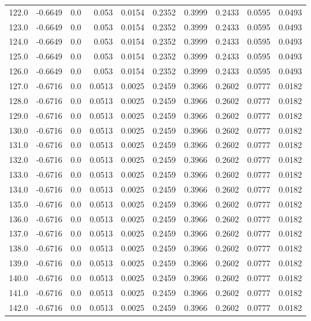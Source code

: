 \begin{longtable}{lrrrrrrrrr}
122.0 & -0.6649 & 0.0 & 0.053 & 0.0154 & 0.2352 & 0.3999 & 0.2433 & 0.0595 & 0.0493 \\
123.0 & -0.6649 & 0.0 & 0.053 & 0.0154 & 0.2352 & 0.3999 & 0.2433 & 0.0595 & 0.0493 \\
124.0 & -0.6649 & 0.0 & 0.053 & 0.0154 & 0.2352 & 0.3999 & 0.2433 & 0.0595 & 0.0493 \\
125.0 & -0.6649 & 0.0 & 0.053 & 0.0154 & 0.2352 & 0.3999 & 0.2433 & 0.0595 & 0.0493 \\
126.0 & -0.6649 & 0.0 & 0.053 & 0.0154 & 0.2352 & 0.3999 & 0.2433 & 0.0595 & 0.0493 \\
127.0 & -0.6716 & 0.0 & 0.0513 & 0.0025 & 0.2459 & 0.3966 & 0.2602 & 0.0777 & 0.0182 \\
128.0 & -0.6716 & 0.0 & 0.0513 & 0.0025 & 0.2459 & 0.3966 & 0.2602 & 0.0777 & 0.0182 \\
129.0 & -0.6716 & 0.0 & 0.0513 & 0.0025 & 0.2459 & 0.3966 & 0.2602 & 0.0777 & 0.0182 \\
130.0 & -0.6716 & 0.0 & 0.0513 & 0.0025 & 0.2459 & 0.3966 & 0.2602 & 0.0777 & 0.0182 \\
131.0 & -0.6716 & 0.0 & 0.0513 & 0.0025 & 0.2459 & 0.3966 & 0.2602 & 0.0777 & 0.0182 \\
132.0 & -0.6716 & 0.0 & 0.0513 & 0.0025 & 0.2459 & 0.3966 & 0.2602 & 0.0777 & 0.0182 \\
133.0 & -0.6716 & 0.0 & 0.0513 & 0.0025 & 0.2459 & 0.3966 & 0.2602 & 0.0777 & 0.0182 \\
134.0 & -0.6716 & 0.0 & 0.0513 & 0.0025 & 0.2459 & 0.3966 & 0.2602 & 0.0777 & 0.0182 \\
135.0 & -0.6716 & 0.0 & 0.0513 & 0.0025 & 0.2459 & 0.3966 & 0.2602 & 0.0777 & 0.0182 \\
136.0 & -0.6716 & 0.0 & 0.0513 & 0.0025 & 0.2459 & 0.3966 & 0.2602 & 0.0777 & 0.0182 \\
137.0 & -0.6716 & 0.0 & 0.0513 & 0.0025 & 0.2459 & 0.3966 & 0.2602 & 0.0777 & 0.0182 \\
138.0 & -0.6716 & 0.0 & 0.0513 & 0.0025 & 0.2459 & 0.3966 & 0.2602 & 0.0777 & 0.0182 \\
139.0 & -0.6716 & 0.0 & 0.0513 & 0.0025 & 0.2459 & 0.3966 & 0.2602 & 0.0777 & 0.0182 \\
140.0 & -0.6716 & 0.0 & 0.0513 & 0.0025 & 0.2459 & 0.3966 & 0.2602 & 0.0777 & 0.0182 \\
141.0 & -0.6716 & 0.0 & 0.0513 & 0.0025 & 0.2459 & 0.3966 & 0.2602 & 0.0777 & 0.0182 \\
142.0 & -0.6716 & 0.0 & 0.0513 & 0.0025 & 0.2459 & 0.3966 & 0.2602 & 0.0777 & 0.0182 \\

\end{longtable}
